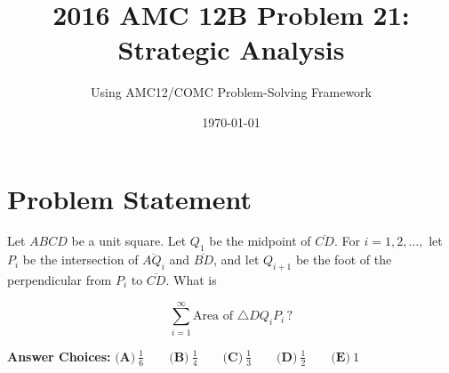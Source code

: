 \documentclass[]{article}
\begin{document}
\title{\textbf{2016 AMC 12B Problem 21:\\Strategic Analysis}}
\author{Using AMC12/COMC Problem-Solving Framework}
\date{\today}
\maketitle

\section*{Problem Statement}

Let $ABCD$ be a unit square. Let $Q_1$ be the midpoint of $\overline{CD}$. For $i=1,2,\dots,$ let $P_i$ be the intersection of $\overline{AQ_i}$ and $\overline{BD}$, and let $Q_{i+1}$ be the foot of the perpendicular from $P_i$ to $\overline{CD}$. What is

\[\sum_{i=1}^{\infty} \text{Area of } \triangle DQ_i P_i \, ?\]

\textbf{Answer Choices:} $\textbf{(A)}\ \frac{1}{6} \qquad \textbf{(B)}\ \frac{1}{4} \qquad \textbf{(C)}\ \frac{1}{3} \qquad \textbf{(D)}\ \frac{1}{2} \qquad \textbf{(E)}\ 1$
\end{document}
